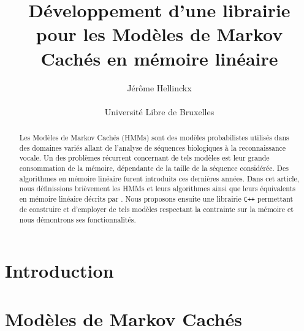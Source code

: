 \documentclass[letterpaper]{article}
\title{Développement d'une librairie pour les Modèles de Markov Cachés en mémoire linéaire}
\author{Jérôme Hellinckx \\
\mbox{}\\
Université Libre de Bruxelles}
\begin{document}
\renewcommand{\labelitemi}{$\bullet$}

\maketitle

\begin{abstract}
Les Modèles de Markov Cachés (HMMs) sont des modèles probabilistes utilisés dans des domaines variés allant de l'analyse de séquences biologiques à la reconnaissance vocale. Un des problèmes récurrent concernant de tels modèles est leur grande consommation de la mémoire, dépendante de la taille de la séquence considérée. Des algorithmes en mémoire linéaire furent introduits ces dernières années. 
Dans cet article, nous définissions brièvement les HMMs et leurs algorithmes ainsi que leurs équivalents en mémoire linéaire décrits par \cite{Ch, LM, MM}. Nous proposons ensuite une librairie \texttt{C++} permettant de construire et d'employer de tels modèles respectant la contrainte sur la mémoire et nous démontrons ses fonctionnalités.
\end{abstract}

\section{Introduction}

 
\section{Modèles de Markov Cachés}
\end{document}
